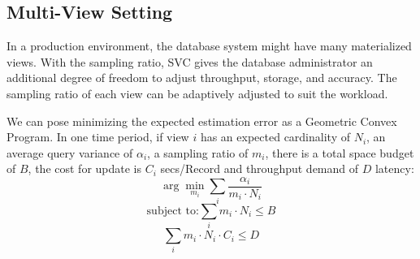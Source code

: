 \subsection{Multi-View Setting}
In a production environment, the database system might have many materialized views. 
With the sampling ratio, SVC gives the database administrator an additional degree of freedom to adjust throughput, storage, and accuracy.
The sampling ratio of each view can be adaptively adjusted to suit the workload.

We can pose minimizing the expected estimation error as a Geometric Convex Program.
In one time period, if view $i$ has an expected cardinality of $N_i$, an average query variance of $\alpha_i$, a sampling ratio of $m_i$, there is a total space budget of $B$, the cost for update is $C_i$ secs/Record and throughput demand of $D$ latency:
\[\arg \min_{m_i} \sum_i \frac{\alpha_i}{m_i \cdot N_i}\]
\[\text{subject to:} \sum_i m_i \cdot N_i \le B \]
\[\sum_i m_i\cdot N_i \cdot C_i \le D \]




